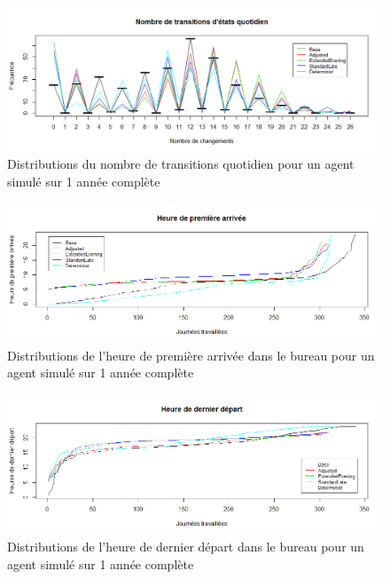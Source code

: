 \begin{figure}
\centering
\includegraphics[scale=0.45]{Images/PageActivities/NbTransitions}
\caption{Distributions du nombre de transitions quotidien pour un agent simulé sur 1 année complète}
\label{fig:NbTransitions}
\end{figure}

\begin{figure}
\centering
\includegraphics[scale=0.45]{Images/PageActivities/PremiereArrivee}
\caption{Distributions de l'heure de première arrivée dans le bureau pour un agent simulé sur 1 année complète}
\label{fig:PremiereArrivee}
\end{figure}

\begin{figure}
\centering
\includegraphics[scale=0.45]{Images/PageActivities/DernierDepart}
\caption{Distributions de l'heure de dernier départ dans le bureau pour un agent simulé sur 1 année complète}
\label{fig:DernierDepart}
\end{figure}

